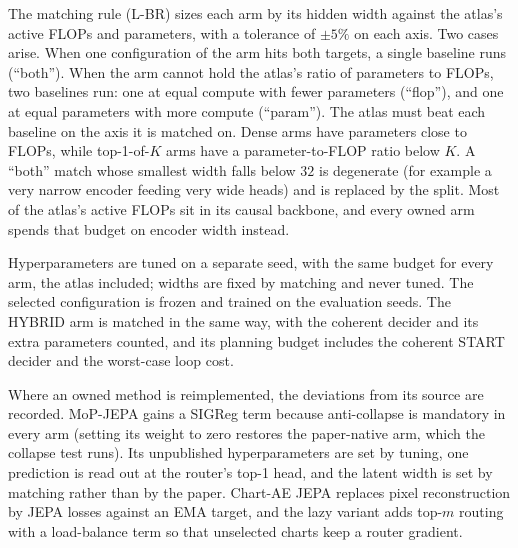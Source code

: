 The matching rule (L-BR) sizes each arm by its hidden width against the atlas's active FLOPs and parameters, with a tolerance of $\pm5\%$ on each axis. Two cases arise. When one configuration of the arm hits both targets, a single baseline runs (``both''). When the arm cannot hold the atlas's ratio of parameters to FLOPs, two baselines run: one at equal compute with fewer parameters (``flop''), and one at equal parameters with more compute (``param''). The atlas must beat each baseline on the axis it is matched on. Dense arms have parameters close to FLOPs, while top-1-of-$K$ arms have a parameter-to-FLOP ratio below $K$. A ``both'' match whose smallest width falls below $32$ is degenerate (for example a very narrow encoder feeding very wide heads) and is replaced by the split. Most of the atlas's active FLOPs sit in its causal backbone, and every owned arm spends that budget on encoder width instead.

Hyperparameters are tuned on a separate seed, with the same budget for every arm, the atlas included; widths are fixed by matching and never tuned. The selected configuration is frozen and trained on the evaluation seeds. The HYBRID arm is matched in the same way, with the coherent decider and its extra parameters counted, and its planning budget includes the coherent START decider and the worst-case loop cost.

Where an owned method is reimplemented, the deviations from its source are recorded. MoP-JEPA gains a SIGReg term because anti-collapse is mandatory in every arm (setting its weight to zero restores the paper-native arm, which the collapse test runs). Its unpublished hyperparameters are set by tuning, one prediction is read out at the router's top-1 head, and the latent width is set by matching rather than by the paper. Chart-AE JEPA replaces pixel reconstruction by JEPA losses against an EMA target, and the lazy variant adds top-$m$ routing with a load-balance term so that unselected charts keep a router gradient.
